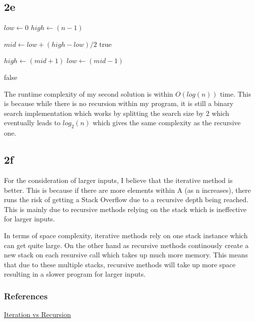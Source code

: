\documentclass[oneside, a4paper]{article}
\begin{document}
\subsection{2e}
\begin{algorithmic}
        \State $low \gets 0$
        \State $high \gets (n - 1)$


            \State $mid \gets low + (high - low) / 2$
                \State \Return true    
            \EndIf
                
                \State $high \gets (mid + 1)$
            \Else
                \State $low \gets (mid - 1)$
            \EndIf

        \EndWhile
        \State \Return false    
        
    \EndFunction
\end{algorithmic}

The runtime complexity of my second solution is within $O(log(n))$ time. This is because while there is no recursion within my program, it is still a binary search implementation which works by splitting the search size by 2 which eventually leads to $log_2(n)$ which gives the same complexity as the recursive one.

\subsection{2f}
For the consideration of larger inputs, I believe that the iterative method is better. This is because if there are more elements within A (as n increases), there runs the risk of getting a Stack Overflow due to a recursive depth being reached. This is mainly due to recursive methods relying on the stack which is ineffective for larger inputs.

In terms of space complexity, iterative methods rely on one stack instance which can get quite large. On the other hand as recursive methods continously create a new stack on each resursive call which takes up much more memory. This means that due to these multiple stacks, recursive methods will take up more space resulting in a slower program for larger inputs.

\subsubsection{References}
\href{https://medium.com/backticks-tildes/iteration-vs-recursion-c2017a483890}{Iteration vs Recursion}
\end{document}
